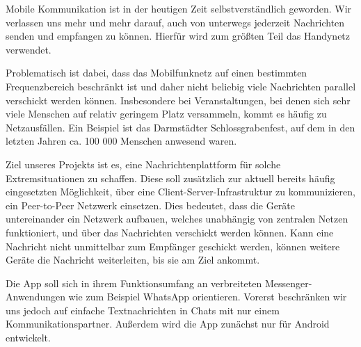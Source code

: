 
Mobile Kommunikation ist in der heutigen Zeit selbstverständlich geworden. Wir verlassen uns mehr und mehr darauf, auch von unterwegs jederzeit Nachrichten senden und empfangen zu können. Hierfür wird zum größten Teil das Handynetz verwendet.

Problematisch ist dabei, dass das Mobilfunknetz auf einen bestimmten Frequenzbereich beschränkt ist und daher nicht beliebig viele Nachrichten parallel verschickt werden können. Insbesondere bei Veranstaltungen, bei denen sich sehr viele Menschen auf relativ geringem Platz versammeln, kommt es häufig zu Netzausfällen. Ein Beispiel ist das Darmstädter Schlossgrabenfest, auf dem in den letzten Jahren ca. 100 000 Menschen anwesend waren.

Ziel unseres Projekts ist es, eine Nachrichtenplattform für solche Extremsituationen zu schaffen. Diese soll zusätzlich zur aktuell bereits häufig eingesetzten Möglichkeit, über eine Client-Server-Infrastruktur zu kommunizieren, ein Peer-to-Peer Netzwerk einsetzen. Dies bedeutet, dass die Geräte untereinander ein Netzwerk aufbauen, welches unabhängig von zentralen Netzen funktioniert, und über das Nachrichten verschickt werden können. Kann eine Nachricht nicht unmittelbar zum Empfänger geschickt werden, können weitere Geräte die Nachricht weiterleiten, bis sie am Ziel ankommt.

Die App soll sich in ihrem Funktionsumfang an verbreiteten Messenger-Anwendungen wie zum Beispiel WhatsApp orientieren. Vorerst beschränken wir uns jedoch auf einfache Textnachrichten in Chats mit nur einem Kommunikationspartner. Außerdem wird die App zunächst nur für Android entwickelt.
